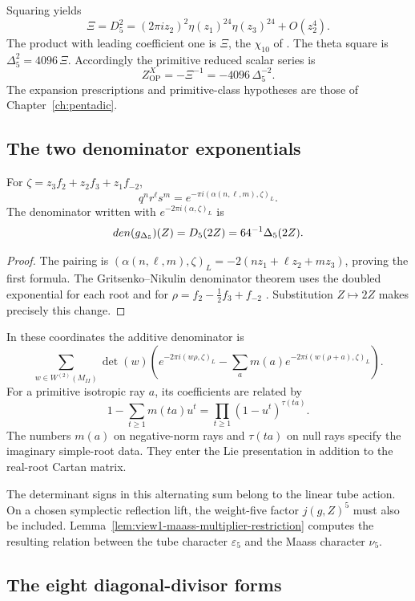 Squaring yields
\[
 \Xi=D_5^2
 =(2\pi iz_2)^2\eta(z_1)^{24}\eta(z_3)^{24}+O(z_2^4).
\]
The product with leading coefficient one is \(\Xi\), the
\(\chi_{10}\) of \cite{OPand,OB}.
The theta square is \(\Delta_5^2=4096\,\Xi\).
Accordingly the primitive reduced scalar series is
\[
 Z_{\mathrm{OP}}^X=-\Xi^{-1}=-4096\,\Delta_5^{-2}.
\]
The expansion prescriptions and primitive-class hypotheses are those
of Chapter~\ref{ch:pentadic}.

\subsection{The two denominator exponentials}

\begin{lemma}
\label{lem:appB-doubling}
For
\(\zeta=z_3f_2+z_2f_3+z_1f_{-2}\),
\[
 q^nr^\ell s^m=e^{-\pi i(\alpha(n,\ell,m),\zeta)_L}.
\]
The denominator written with
\(e^{-2\pi i(\alpha,\zeta)_L}\) is
\[
 den({g_{\Delta_5}})(Z)=D_5(2Z)
 =64^{-1}\Delta_5(2Z).
\]
\end{lemma}

\begin{proof}
The pairing is
\((\alpha(n,\ell,m),\zeta)_L
=-2(nz_1+\ell z_2+mz_3)\), proving the first formula.
The Gritsenko--Nikulin denominator theorem uses the doubled
exponential for each root and for
\(\rho=f_2-\tfrac12f_3+f_{-2}\)
\cite[\S3]{GN}.
Substitution \(Z\mapsto2Z\) makes precisely this change.
\end{proof}

In these coordinates the additive denominator is
\[
 \sum_{w\in W^{(2)}(M_{II})}\det(w)
 \left(e^{-2\pi i(w\rho,\zeta)_L}
 -\sum_a m(a)e^{-2\pi i(w(\rho+a),\zeta)_L}\right).
\]
For a primitive isotropic ray \(a\), its coefficients are related by
\[
 1-\sum_{t\geq1}m(ta)u^t
 =\prod_{t\geq1}(1-u^t)^{\tau(ta)}.
\]
The numbers \(m(a)\) on negative-norm rays and \(\tau(ta)\)
on null rays specify the imaginary simple-root data.
They enter the Lie presentation in addition to the real-root
Cartan matrix.

The determinant signs in this alternating sum belong to the linear
tube action.  On a chosen symplectic reflection lift,
the weight-five factor \(j(g,Z)^5\) must also be included.
Lemma~\ref{lem:view1-maass-multiplier-restriction} computes the
resulting relation between the tube character \(\varepsilon_5\)
and the Maass character \(\nu_5\).

\subsection{The eight diagonal-divisor forms}

